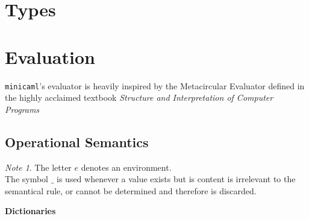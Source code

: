 \documentclass[a4paper, 10pt]{article}
\theoremstyle{plain}%
\theoremstyle{definition}
\theoremstyle{remark}
\newtheorem*{note}{Note}
\begin{document}
\begin{multicols}{2}
\section{Types}

\section{Evaluation}
\texttt{minicaml}'s evaluator is heavily inspired by the Metacircular Evaluator defined in the highly acclaimed textbook \textit{Structure and Interpretation of Computer Programs} \cite{Abelson1996}
\subsection{Operational Semantics}

\begin{note}
	The letter $e$ denotes an environment. \\
	The symbol $\_$ is used whenever a value exists but is content is irrelevant
	to the semantical rule, or cannot be determined and therefore is discarded.
\end{note}


\textbf{Dictionaries}


\end{multicols}
\end{document}
